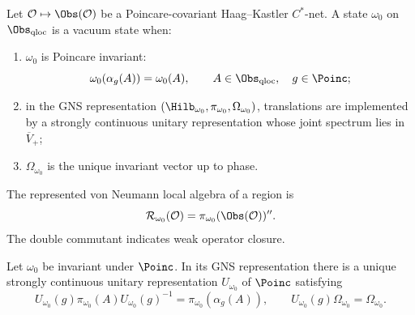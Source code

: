 \begin{definition}
\label{def:vacuum-representation-aqft}
Let \(\mathcal O\mapsto\Obs(\mathcal O)\) be a Poincare-covariant
Haag--Kastler \(C^*\)-net.  A state \(\omega_0\) on
\(\Obs_{\rm qloc}\) is a vacuum state when:
\begin{enumerate}[label=\textup{(\roman*)}]
\item \(\omega_0\) is Poincare invariant:
\[
  \omega_0(\alpha_g(A))=\omega_0(A),
  \qquad A\in\Obs_{\rm qloc},\quad g\in\Poinc ;
\]
\item in the GNS representation
\((\Hilb_{\omega_0},\pi_{\omega_0},\Omega_{\omega_0})\), translations are
implemented by a strongly continuous unitary representation whose joint
spectrum lies in \(\overline V_+\);
\item \(\Omega_{\omega_0}\) is the unique invariant vector up to phase.
\end{enumerate}
The represented von Neumann local algebra of a region is
\[
  \mathcal R_{\omega_0}(\mathcal O)
  =
  \pi_{\omega_0}(\Obs(\mathcal O))''.
\]
The double commutant indicates weak operator closure.
\end{definition}

\begin{proposition}
\label{prop:invariant-state-unitary-implementation}
Let \(\omega_0\) be invariant under \(\Poinc\).  In its GNS representation
there is a unique strongly continuous unitary representation
\(U_{\omega_0}\) of \(\Poinc\) satisfying
\begin{equation}
  U_{\omega_0}(g)\pi_{\omega_0}(A)U_{\omega_0}(g)^{-1}
  =
  \pi_{\omega_0}(\alpha_g(A)),
  \qquad
  U_{\omega_0}(g)\Omega_{\omega_0}=\Omega_{\omega_0}.
  \label{eq:vacuum-unitary-implementation}
\end{equation}
\end{proposition}

